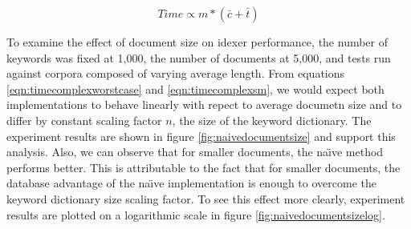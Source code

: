\documentclass[10pt]{article}
\begin{document}
\begin{equation}
\label{eqn:timecomplexsm}
Time \propto m * ( \bar{c}  + \bar{t} )
\end{equation}

To examine the effect of document size on idexer performance, the number of keywords was
fixed at 1,000, the number of documents at 5,000, and tests run
against corpora composed of varying average length. From equations
\ref{eqn:timecomplexworstcase} and \ref{eqn:timecomplexsm}, we would
expect both implementations to behave linearly with repect to average
documetn size and to differ by constant scaling factor $n$, the size
of the keyword dictionary. The experiment results are shown in figure
\ref{fig:naivedocumentsize} and support this analysis. Also, we can observe
that for smaller documents, the na\"{\i}ve method
performs better. This is attributable to the fact that for smaller
documents, the database advantage of the na\"{\i}ve implementation is
enough to overcome the keyword dictionary size scaling factor. To see
this effect more clearly, experiment results are plotted on a
logarithmic scale in figure \ref{fig:naivedocumentsizelog}.
\end{document}

